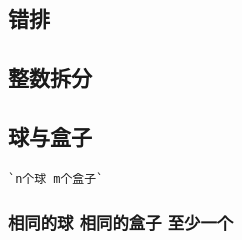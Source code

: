 \documentclass[a4paper]{article}
\begin{document}
\begin{CJK*}{UTF8}{gbsn}
\begin{multicols}{3}
\begin{flushleft}
\subsection{错排}


\subsection{整数拆分}


\subsection{球与盒子}
\begin{lstlisting}
`n个球 m个盒子`
\end{lstlisting}



\subsubsection{相同的球 相同的盒子 至少一个}



\end{flushleft}
\end{multicols}
\end{CJK*}
\end{document}
